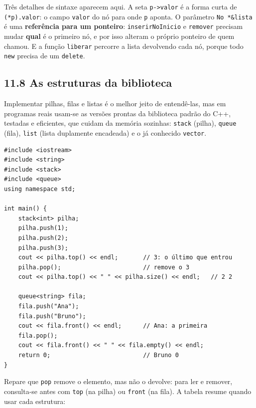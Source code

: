 Três detalhes de sintaxe aparecem aqui. A seta \texttt{p->valor} é a forma curta de \texttt{(*p).valor}: o campo \texttt{valor} do nó para onde \texttt{p} aponta. O parâmetro \texttt{No *\&lista} é uma \textbf{referência para um ponteiro}: \texttt{inserirNoInicio} e \texttt{remover} precisam mudar \textbf{qual} é o primeiro nó, e por isso alteram o próprio ponteiro de quem chamou. E a função \texttt{liberar} percorre a lista devolvendo cada nó, porque todo \texttt{new} precisa de um \texttt{delete}.

\subsection{11.8 As estruturas da biblioteca}

Implementar pilhas, filas e listas é o melhor jeito de entendê-las, mas em programas reais usam-se as versões prontas da biblioteca padrão do C++, testadas e eficientes, que cuidam da memória sozinhas: \texttt{stack} (pilha), \texttt{queue} (fila), \texttt{list} (lista duplamente encadeada) e o já conhecido \texttt{vector}.

\begin{codigo}
\begin{Verbatim}[breaklines=true, breaksymbolleft={}, fontsize=\footnotesize]
#include <iostream>
#include <string>
#include <stack>
#include <queue>
using namespace std;

int main() {
    stack<int> pilha;
    pilha.push(1);
    pilha.push(2);
    pilha.push(3);
    cout << pilha.top() << endl;       // 3: o último que entrou
    pilha.pop();                       // remove o 3
    cout << pilha.top() << " " << pilha.size() << endl;   // 2 2

    queue<string> fila;
    fila.push("Ana");
    fila.push("Bruno");
    cout << fila.front() << endl;      // Ana: a primeira
    fila.pop();
    cout << fila.front() << " " << fila.empty() << endl;
    return 0;                          // Bruno 0
}
\end{Verbatim}
\end{codigo}

Repare que \texttt{pop} remove o elemento, mas não o devolve: para ler e remover, consulta-se antes com \texttt{top} (na pilha) ou \texttt{front} (na fila). A tabela resume quando usar cada estrutura:

